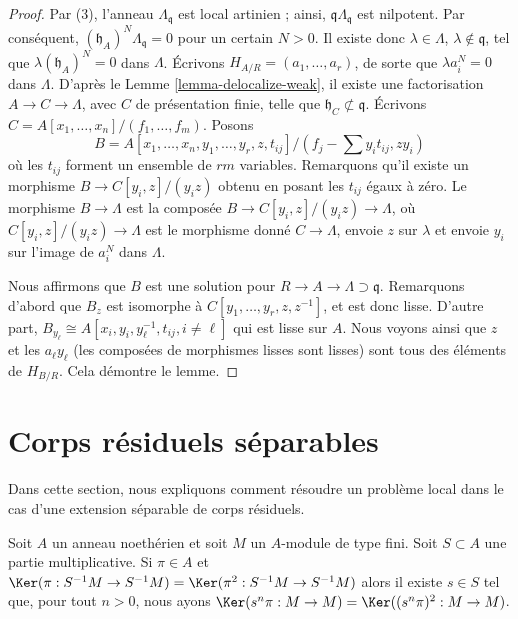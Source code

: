 \begin{proof}
Par (3), l'anneau $\Lambda_\mathfrak q$ est local artinien ; ainsi,
$\mathfrak q\Lambda_\mathfrak q$ est nilpotent. Par conséquent,
$(\mathfrak h_A)^N \Lambda_\mathfrak q = 0$ pour un certain $N > 0$.
Il existe donc $\lambda \in \Lambda$, $\lambda \not \in \mathfrak q$,
tel que $\lambda (\mathfrak h_A)^N = 0$ dans $\Lambda$.
Écrivons $H_{A/R} = (a_1, \ldots, a_r)$, de sorte que $\lambda a_i^N = 0$
dans $\Lambda$. D'après le Lemme \ref{lemma-delocalize-weak}, il existe une factorisation
$A \to C \to \Lambda$, avec $C$ de présentation finie, telle que
$\mathfrak h_C \not \subset \mathfrak q$.
Écrivons $C = A[x_1, \ldots, x_n]/(f_1, \ldots, f_m)$.
Posons
$$
B = A[x_1, \ldots, x_n, y_1, \ldots, y_r, z, t_{ij}]/
(f_j - \sum y_i t_{ij}, zy_i)
$$
où les $t_{ij}$ forment un ensemble de $rm$ variables.
Remarquons qu'il existe un morphisme $B \to C[y_i, z]/(y_iz)$ obtenu en posant les $t_{ij}$
égaux à zéro. Le morphisme $B \to \Lambda$ est la composée
$B \to C[y_i, z]/(y_iz) \to \Lambda$, où $C[y_i, z]/(y_iz) \to \Lambda$
est le morphisme donné $C \to \Lambda$, envoie $z$ sur $\lambda$ et envoie
$y_i$ sur l'image de $a_i^N$ dans $\Lambda$.

\medskip\noindent
Nous affirmons que $B$ est une solution pour $R \to A \to \Lambda \supset \mathfrak q$.
Remarquons d'abord que $B_z$ est isomorphe à $C[y_1, \ldots, y_r, z, z^{-1}]$,
et est donc lisse. D'autre part,
$B_{y_\ell} \cong A[x_i, y_i, y_\ell^{-1}, t_{ij}, i \not = \ell]$
qui est lisse sur $A$. Nous voyons ainsi que $z$ et les $a_\ell y_\ell$
(les composées de morphismes lisses sont lisses) sont tous
des éléments de $H_{B/R}$. Cela démontre le lemme.
\end{proof}




\section{Corps résiduels séparables}
\label{section-separable}

\noindent
Dans cette section, nous expliquons comment résoudre un problème local dans le cas
d'une extension séparable de corps résiduels.

\begin{lemma}[Ogoma]
\label{lemma-ogoma}
Soit $A$ un anneau noethérien et soit $M$ un $A$-module de type fini.
Soit $S \subset A$ une partie multiplicative. Si $\pi \in A$ et
$\Ker(\pi : S^{-1}M \to S^{-1}M) =
\Ker(\pi^2 : S^{-1}M \to S^{-1}M)$
alors il existe $s \in S$ tel que, pour tout $n > 0$, nous ayons
$\Ker(s^n\pi : M \to M) = \Ker((s^n\pi)^2 : M \to M)$.
\end{lemma}

